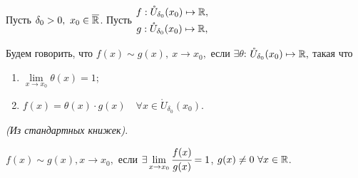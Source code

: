 \begin{definition}
    Пусть $\delta_{0} > 0, \ x_{0} \in \overline{\mathbb{R}}$. Пусть $ \begin{gathered}
        f: \mathring{U}_{\delta_{0}}(x_{0}) \mapsto \mathbb{R}, \\
        g:\mathring{U}_{\delta_{0}}(x_{0}) \mapsto \mathbb{R},
    \end{gathered}$ 
    
    Будем говорить, что $f(x) \sim g(x),\  x\to x_{0},$ если $\exists \theta$:  $\mathring{U}_{\delta_{0}}(x_{0}) \mapsto \mathbb{R},$ такая что \begin{enumerate}
        \item $\lim\limits_{x \to x_{0}} \theta(x)= 1$;
        \item $f(x) = \theta(x) \cdot g(x) \quad \forall x \in \mathring{U}_{\delta_{0}}(x_{0}).$
    \end{enumerate}
\end{definition}

\begin{definition}
    \textit{(Из стандартных книжек)}.

    $f(x) \sim g(x), x\to x_{0},$ если $\exists
     \lim\limits_{x \to x_{0}} \cfrac{f(x)}{g(x)} = 1$, $g (x) \neq 0 \ \forall x \in \mathbb{R}$.
\end{definition}

